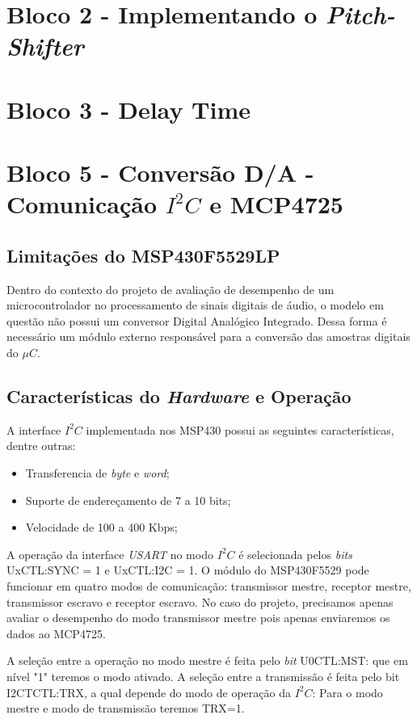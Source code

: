 		
\section{Bloco 2 - Implementando o \textit{Pitch-Shifter}}

\section{Bloco 3 - Delay Time}

\section{Bloco 5 - Conversão D/A - Comunicação $I^2C$ e MCP4725}
	
	
	\subsection{Limitações do MSP430F5529LP}
		
		Dentro do contexto do projeto de avaliação de desempenho de um microcontrolador no processamento de sinais digitais de áudio, o modelo em questão não possui um conversor Digital Analógico Integrado. Dessa forma é necessário um módulo externo responsável para a conversão das amostras digitais do $\mu C$.
		
	\subsection{Características do \textit{Hardware} e Operação}
	
		A interface $ I^2C $ implementada nos MSP430 possui as seguintes características, dentre outras:
		\begin{itemize}
			\item Transferencia de \textit{byte} e \textit{word};
			\item Suporte de endereçamento de 7 a 10 bits;
			\item Velocidade de 100 a 400 Kbps;
		\end{itemize}
	
		A operação da interface \textit{USART} no modo $ I^2C $ é selecionada pelos \textit{bits} UxCTL:SYNC = 1 e UxCTL:I2C = 1. O módulo do MSP430F5529 pode funcionar em quatro modos de comunicação: transmissor mestre, receptor mestre, transmissor escravo e receptor escravo. No caso do projeto, precisamos apenas avaliar o desempenho do modo transmissor mestre pois apenas enviaremos os dados ao MCP4725.
		
		A seleção entre a operação no modo mestre é feita pelo \textit{bit} U0CTL:MST: que em nível "1" teremos o modo ativado. A seleção entre a transmissão é feita pelo bit I2CTCTL:TRX, a qual depende do modo de operação da $ I^2C $: Para o modo mestre e modo de transmissão teremos TRX=1.
		
